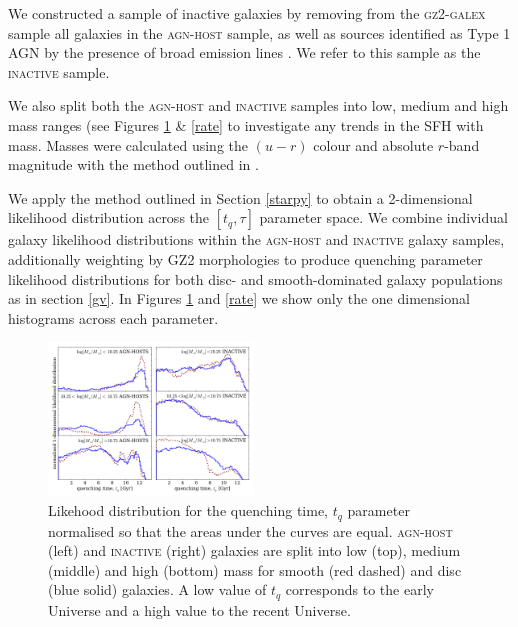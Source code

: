 \documentclass[useAMS,usenatbib]{mn2e}
\begin{document}
We constructed a sample of inactive galaxies by removing from the \textsc{gz2-galex} sample all galaxies in the \textsc{agn-host} sample, as well as sources identified as Type 1 AGN by the presence of broad emission lines \citep{Oh15}. We refer to this sample as the \textsc{inactive} sample. 

We also split both the \textsc{agn-host} and \textsc{inactive} samples into low, medium and high mass ranges (see Figures \ref{time} \& \ref{rate} to investigate any trends in the SFH with mass. Masses were calculated using the $(u-r)$ colour and absolute $r$-band magnitude with the method outlined in \cite{Baldry06}.

We apply the method outlined in Section \ref{starpy} to obtain a 2-dimensional likelihood distribution across the $[t_q, \tau]$ parameter space. We combine individual galaxy likelihood distributions within the \textsc{agn-host} and \textsc{inactive} galaxy samples, additionally weighting by GZ2 morphologies to produce quenching parameter likelihood distributions for both disc- and smooth-dominated galaxy populations as in section \ref{gv}. In Figures \ref{time} and \ref{rate} we show only the one dimensional histograms across each parameter. 


\begin{figure}
\includegraphics[width=0.485\textwidth]{quenching_time_histograms_smooth_red_disc_blue_verticalbpt_seyf_only_hardcut_minimal.pdf}
\caption{Likehood distribution for the quenching time, $t_q$ parameter normalised so that the areas under the curves are equal. \textsc{agn-host} (left) and \textsc{inactive} (right) galaxies are split into low (top), medium (middle) and high (bottom) mass for smooth (red dashed) and disc (blue solid) galaxies. A low value of $t_q$ corresponds to the early Universe and a high value to the recent Universe.}
\label{time}
\end{figure}
\end{document}
